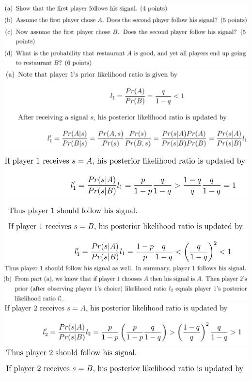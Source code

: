 \documentclass[8pt,landscape]{extarticle}
\begin{document}
\begin{multicols*}{3}
    \includegraphics[width=0.74\linewidth,keepaspectratio]{Screenshots/Screenshot 2024-03-11 195439.png}
    \includegraphics[width=0.74\linewidth,keepaspectratio]{Screenshots/Screenshot 2024-03-11 195445.png}
    \includegraphics[width=0.72\linewidth,keepaspectratio]{Screenshots/Screenshot 2024-03-11 195508.png}
    \includegraphics[width=0.63\linewidth,keepaspectratio]{Screenshots/Screenshot 2024-03-11 195512.png}
    \includegraphics[width=0.65\linewidth,keepaspectratio]{Screenshots/Screenshot 2024-03-11 195519.png}
    \includegraphics[width=0.77\linewidth,keepaspectratio]{Screenshots/Screenshot 2024-03-11 195525.png}
    \includegraphics[width=0.81\linewidth,keepaspectratio]{Screenshots/Screenshot 2024-03-11 195530.png}
    \includegraphics[width=0.68\linewidth,keepaspectratio]{Screenshots/Screenshot 2024-03-11 195533.png}
    \includegraphics[width=0.64\linewidth,keepaspectratio]{Screenshots/Screenshot 2024-03-11 195538.png}

\end{multicols*}
\end{document}

